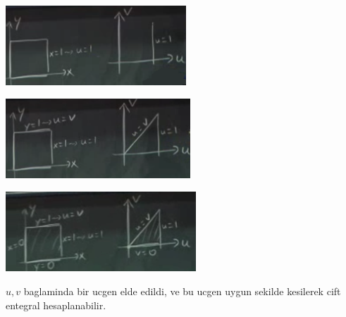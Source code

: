 \documentclass[12pt,fleqn]{article}
\begin{document}
\includegraphics[height=3cm]{18_9.png}

\includegraphics[height=3cm]{18_10.png}

\includegraphics[height=3cm]{18_11.png}

$u,v$ baglaminda bir ucgen elde edildi, ve bu ucgen uygun sekilde kesilerek
cift entegral hesaplanabilir. 
\end{document}

